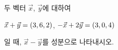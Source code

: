 두 벡터 $\vec{x}$, $\vec{y}$에 대하여 \par\smallskip\noindent\hspace*{1.5em}$\vec{x}+\vec{y}=(3{,}\mkern3mu\mathopen{}6{,}\mkern3mu\mathopen{}2)$, $-\vec{x}+2\vec{y}=(3{,}\mkern3mu\mathopen{}0{,}\mkern3mu\mathopen{}4)$\par\smallskip\noindent 일 때, $\vec{x}-\vec{y}$를 성분으로 나타내시오.
